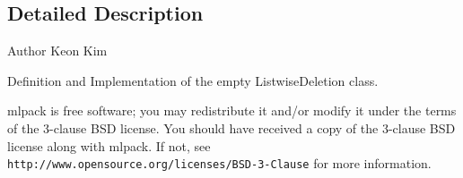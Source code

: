 \subsection{Detailed Description}
\begin{DoxyAuthor}{Author}
Keon Kim
\end{DoxyAuthor}
Definition and Implementation of the empty Listwise\+Deletion class.

mlpack is free software; you may redistribute it and/or modify it under the terms of the 3-\/clause B\+SD license. You should have received a copy of the 3-\/clause B\+SD license along with mlpack. If not, see {\tt http\+://www.\+opensource.\+org/licenses/\+B\+S\+D-\/3-\/\+Clause} for more information. 